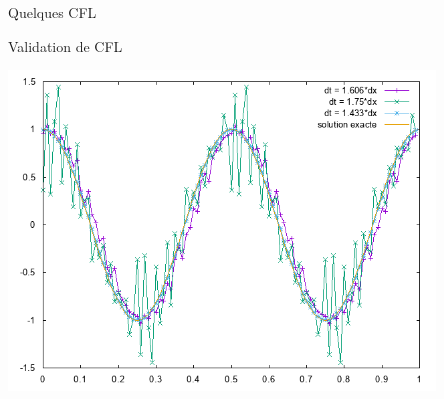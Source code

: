 \documentclass{beamer}
\begin{document}
\begin{frame}{Quelques CFL}
{\begin{center}
    \end{center}
  }
\end{frame}

\begin{frame}{Validation de CFL}
  \begin{center}
    \includegraphics[width=0.85\textwidth]{simuCFL.png}
  \end{center}
\end{frame}
\end{document}
